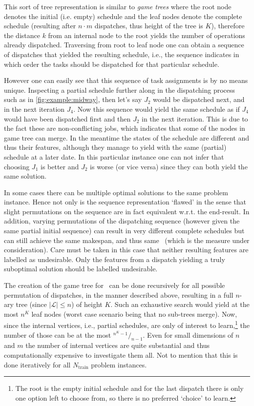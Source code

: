 This sort of tree representation is similar to \emph{game trees} 
\citep[cf.][]{Rosen03} where the root node denotes the initial (i.e. empty) 
schedule and the leaf nodes denote the complete schedule (resulting after 
$n\cdot m$ dispatches, thus height of the tree is $K$), therefore the 
distance $k$ from an internal node to the root yields the number of operations 
already dispatched. Traversing from root to leaf node one can obtain a sequence 
of dispatches that yielded the resulting schedule, i.e., the sequence indicates 
in which order the tasks should be dispatched for that particular schedule. 

However one can easily see that this sequence of task assignments is by no 
means unique. 
Inspecting a partial schedule further along in the dispatching process such as 
in \cref{fig:example:midway}, then let's say $J_2$ would be dispatched next, 
and in the next iteration $J_4$. 
Now this sequence would yield the same schedule as if $J_4$ would have been 
dispatched first and then $J_2$ in the next iteration. 
This is due to the fact these are non-conflicting jobs, which indicates that 
some of the nodes in game tree can merge. 
In the meantime the states of the schedule are different and thus their 
features, although they manage to yield with the same (partial) schedule at a 
later date.  %
In this particular instance one can not infer that choosing $J_1$ is better and 
$J_2$ is worse (or vice versa) since they can both yield the same solution.

In some cases there can be multiple optimal solutions to the same problem 
instance. 
Hence not only is the sequence representation `flawed' in the sense that slight 
permutations on the sequence are in fact equivalent w.r.t. the end-result.
In addition, varying permutations of the dispatching sequence (however given 
the same partial initial sequence) can result in very different complete 
schedules but can still achieve the same makespan, and thus same \fullnamerho\ 
(which is the measure under consideration). 
Care must be taken in this case that neither resulting features are labelled as 
undesirable. 
Only the features from a dispatch yielding a truly suboptimal solution should 
be labelled undesirable. 

The creation of the game tree for \jsp\ can be done recursively for all 
possible permutation of dispatches, in the manner described above, resulting in 
a full \mbox{$n$-ary} tree (since $|\mathcal{L}|\leq n$) of height $K$. Such 
an exhaustive search would yield at the most $n^K$ leaf nodes (worst case 
scenario being that no sub-trees merge). Now, since the internal vertices, 
i.e., partial schedules, are only of interest to learn,\footnote{The root is 
  the empty initial schedule and for the last dispatch there is only one option 
  left to choose from, so there is no preferred `choice' to learn.} the number 
  of 
those can be at the most \mbox{${}^{n^K-1}/_{n-1}$}.
Even for small dimensions of $n$ and $m$ the number of internal vertices are 
quite substantial and thus computationally expensive to investigate them all. 
Not to mention that this is done iteratively for all $N_{\text{train}}$ problem 
instances.


